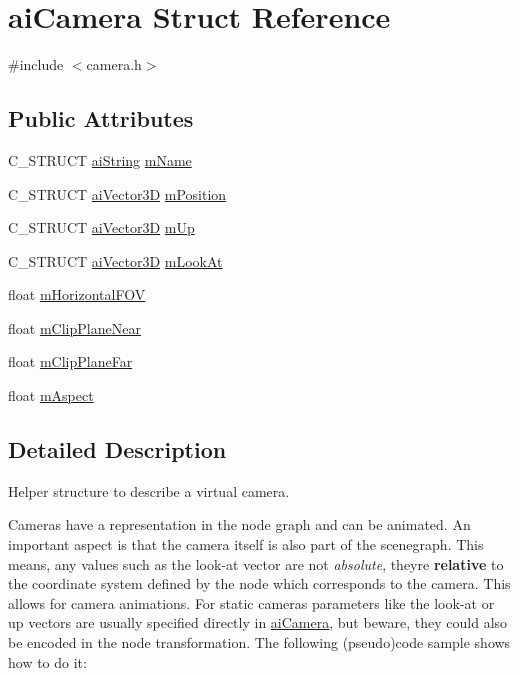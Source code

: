 \hypertarget{structai_camera}{}\section{ai\+Camera Struct Reference}
\label{structai_camera}


{\ttfamily \#include $<$camera.\+h$>$}

\subsection*{Public Attributes}
\begin{DoxyCompactItemize}
\item 
C\+\_\+\+S\+T\+R\+U\+CT \hyperlink{structai_string}{ai\+String} \hyperlink{structai_camera_aa6a5fe5e04b3db1b23f69eb9910c6816}{m\+Name}
\item 
C\+\_\+\+S\+T\+R\+U\+CT \hyperlink{structai_vector3_d}{ai\+Vector3D} \hyperlink{structai_camera_a518617ea192ca0698e748a4399e7c3a5}{m\+Position}
\item 
C\+\_\+\+S\+T\+R\+U\+CT \hyperlink{structai_vector3_d}{ai\+Vector3D} \hyperlink{structai_camera_a7fb42b287389b4f99c883098268d6d1a}{m\+Up}
\item 
C\+\_\+\+S\+T\+R\+U\+CT \hyperlink{structai_vector3_d}{ai\+Vector3D} \hyperlink{structai_camera_af9463249ac870e030fa435b1186cef23}{m\+Look\+At}
\item 
float \hyperlink{structai_camera_adcdea73ece19ea0a9068f5544ec23592}{m\+Horizontal\+F\+OV}
\item 
float \hyperlink{structai_camera_a720e8c94c036dcefe4b13cc1c69c521e}{m\+Clip\+Plane\+Near}
\item 
float \hyperlink{structai_camera_aa9ccf77e3d7ca3dc8f46df931b65172f}{m\+Clip\+Plane\+Far}
\item 
float \hyperlink{structai_camera_ae414556eaa6f910b5927f465d97bf70c}{m\+Aspect}
\end{DoxyCompactItemize}


\subsection{Detailed Description}
Helper structure to describe a virtual camera.

Cameras have a representation in the node graph and can be animated. An important aspect is that the camera itself is also part of the scenegraph. This means, any values such as the look-\/at vector are not {\itshape absolute}, they\textquotesingle{}re {\bfseries relative} to the coordinate system defined by the node which corresponds to the camera. This allows for camera animations. For static cameras parameters like the \textquotesingle{}look-\/at\textquotesingle{} or \textquotesingle{}up\textquotesingle{} vectors are usually specified directly in \hyperlink{structai_camera}{ai\+Camera}, but beware, they could also be encoded in the node transformation. The following (pseudo)code sample shows how to do it\+: ~\newline
~\newline
 
